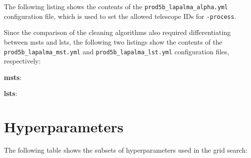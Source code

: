 The following listing shows the contents of the \texttt{prod5b\_lapalma\_alpha.yml} configuration file,
which is used to set the allowed telescope IDs for \ctapipe{}\texttt{-process}.
\begin{spacing}{0.5}
    \begin{mdframed}[backgroundcolor=codebg, hidealllines=true, leftmargin=0cm,rightmargin=0cm, skipabove=0pt, innerleftmargin=0,innerrightmargin=0,]
    
    \end{mdframed}
\end{spacing}

Since the comparison of the cleaning algorithms also required differentiating between \glspl{mst}
and \glspl{lst}, the following two listings show the contents of the \texttt{prod5b\_lapalma\_mst.yml} and
\texttt{prod5b\_lapalma\_lst.yml} configuration files, respectively:
\begin{description}
    \item \textbf{\glspl{mst}}:\medskip
    \begin{spacing}{0.5}
        \begin{mdframed}[backgroundcolor=codebg, hidealllines=true, leftmargin=0cm,rightmargin=0cm, skipabove=0pt, innerleftmargin=0,innerrightmargin=0,]
        
        \end{mdframed}
    \end{spacing}

    \item \textbf{\glspl{lst}}:\medskip
    \begin{spacing}{0.5}
        \begin{mdframed}[backgroundcolor=codebg, hidealllines=true, leftmargin=0cm,rightmargin=0cm, skipabove=0pt, innerleftmargin=0,innerrightmargin=0,]
        
        \end{mdframed}
    \end{spacing}
\end{description}


\section{Hyperparameters}%
\label{ap:hyperparameters}

The following table shows the subsets of hyperparameters used in the grid search:

